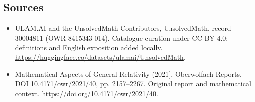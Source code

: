 \documentclass[11pt]{article}
\begin{document}
\subsection{Sources}
\begin{itemize}
\item[\hypertarget{source:30004811:1}{S1}] ULAM.AI and the UnsolvedMath Contributors, UnsolvedMath, record 30004811 (OWR-8415343-014). Catalogue curation under CC BY 4.0; definitions and English exposition added locally.
\url{https://huggingface.co/datasets/ulamai/UnsolvedMath}.
\item[\hypertarget{source:30004811:2}{S2}] Mathematical Aspects of General Relativity (2021), Oberwolfach Reports, DOI 10.4171/owr/2021/40, pp. 2157--2267. Original report and mathematical context.
\url{https://doi.org/10.4171/owr/2021/40}.
\end{itemize}
\label{end:30004811}
\end{document}
